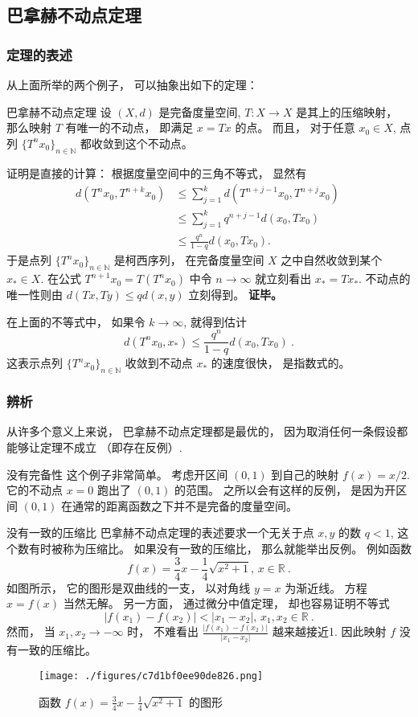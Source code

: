 \subsection{巴拿赫不动点定理}
\subsubsection{定理的表述}
从上面所举的两个例子， 可以抽象出如下的定理：
\begin{theorem}{巴拿赫不动点定理}\label{the_ConMap_1}
设 $(X,d)$ 是完备度量空间, $T:X\to X$ 是其上的压缩映射， 那么映射 $T$ 有唯一的不动点， 即满足 $x=Tx$ 的点。 而且， 对于任意 $x_0\in X$, 点列 $\{T^nx_0\}_{n\in\mathbb{N}}$ 都收敛到这个不动点。
\end{theorem}
证明是直接的计算： 根据度量空间中的三角不等式， 显然有
$$
\begin{aligned}
d(T^nx_0,T^{n+k}x_0)
&\leq \sum_{j=1}^k d(T^{n+j-1}x_0,T^{n+j}x_0)\\
&\leq \sum_{j=1}^k q^{n+j-1}d(x_0,Tx_0)\\
&\leq \frac{q^n}{1-q}d(x_0,Tx_0).
\end{aligned}~
$$
于是点列 $\{T^nx_0\}_{n\in\mathbb{N}}$ 是柯西序列， 在完备度量空间 $X$ 之中自然收敛到某个 $x_*\in X$. 在公式 $T^{n+1}x_0=T(T^nx_0)$ 中令 $n\to\infty$ 就立刻看出 $x_*=Tx_*$. 不动点的唯一性则由 $d(Tx,Ty)\leq qd(x,y)$ 立刻得到。 \textbf{证毕。}

在上面的不等式中， 如果令 $k\to\infty$, 就得到估计
$$
d(T^nx_0,x_*)\leq\frac{q^n}{1-q}d(x_0,Tx_0)~.
$$
这表示点列 $\{T^nx_0\}_{n\in\mathbb{N}}$ 收敛到不动点 $x_*$ 的速度很快， 是指数式的。

\subsubsection{辨析}
从许多个意义上来说， 巴拿赫不动点定理都是最优的， 因为取消任何一条假设都能够让定理不成立 （即存在反例）.

\begin{example}{没有完备性}
这个例子非常简单。 考虑开区间 $(0,1)$ 到自己的映射 $f(x)=x/2$. 它的不动点 $x=0$ 跑出了 $(0,1)$ 的范围。 之所以会有这样的反例， 是因为开区间 $(0,1)$ 在通常的距离函数之下并不是完备的度量空间。
\end{example}

\begin{example}{没有一致的压缩比}
巴拿赫不动点定理的表述要求一个无关于点 $x,y$ 的数 $q<1$, 这个数有时被称为压缩比。 如果没有一致的压缩比， 那么就能举出反例。 例如函数
$$
f(x)=\frac{3}{4}x-\frac{1}{4}\sqrt{x^2+1},\,x\in\mathbb{R}~.
$$
如图所示， 它的图形是双曲线的一支， 以对角线 $y=x$ 为渐近线。 方程 $x=f(x)$ 当然无解。 另一方面， 通过微分中值定理， 却也容易证明不等式
$$
|f(x_1)-f(x_2)|<|x_1-x_2|,\,x_1,x_2\in\mathbb{R}~.
$$
然而， 当 $x_1,x_2\to-\infty$ 时， 不难看出 $\frac{|f(x_1)-f(x_2)|}{|x_1-x_2|}$ 越来越接近1. 因此映射 $f$ 没有一致的压缩比。 
\begin{figure}[ht]
\centering
\texttt{[image: ./figures/c7d1bf0ee90de826.png]}
\caption{函数 $f(x)=\frac{3}{4}x-\frac{1}{4}\sqrt{x^2+1}$ 的图形} \label{fig_ConMap_2}
\end{figure}

\end{example}


